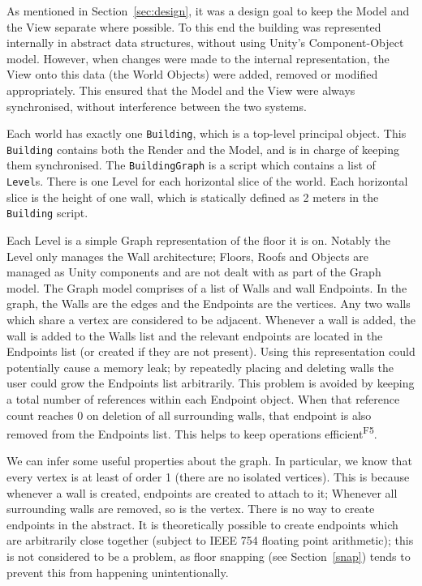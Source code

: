 As mentioned in Section~\ref{sec:design}, it was a design goal to keep the Model and the View separate where possible. To this end the building was represented internally in abstract data structures, without using Unity's Component-Object model. However, when changes were made to the internal representation, the View onto this data (the World Objects) were added, removed or modified appropriately. This ensured that the Model and the View were always synchronised, without interference between the two systems.

Each world has exactly one \verb|Building|, which is a top-level principal object. This \verb|Building| contains both the Render and the Model, and is in charge of keeping them synchronised. The \verb|BuildingGraph| is a script which contains a list of \verb|Level|s. There is one Level for each horizontal slice of the world. Each horizontal slice is the height of one wall, which is statically defined as 2 meters in the \verb|Building| script.

Each Level is a simple Graph representation of the floor it is on. Notably the Level only manages the Wall architecture; Floors, Roofs and Objects are managed as Unity components and are not dealt with as part of the Graph model. The Graph model comprises of a list of Walls and wall Endpoints. In the graph, the Walls are the edges and the Endpoints are the vertices. Any two walls which share a vertex are considered to be adjacent. Whenever a wall is added, the wall is added to the Walls list and the relevant endpoints are located in the Endpoints list (or created if they are not present). Using this representation could potentially cause a memory leak; by repeatedly placing and deleting walls the user could grow the Endpoints list arbitrarily. This problem is avoided by keeping a total number of references within each Endpoint object. When that reference count reaches 0 on deletion of all surrounding walls, that endpoint is also removed from the Endpoints list. This helps to keep operations efficient\textsuperscript{F5}.

We can infer some useful properties about the graph. In particular, we know that every vertex is at least of order 1 (there are no isolated vertices). This is because whenever a wall is created, endpoints are created to attach to it; Whenever all surrounding walls are removed, so is the vertex. There is no way to create endpoints in the abstract. It is theoretically possible to create endpoints which are arbitrarily close together (subject to IEEE 754 floating point arithmetic); this is not considered to be a problem, as floor snapping (see Section~\ref{snap}) tends to prevent this from happening unintentionally.


